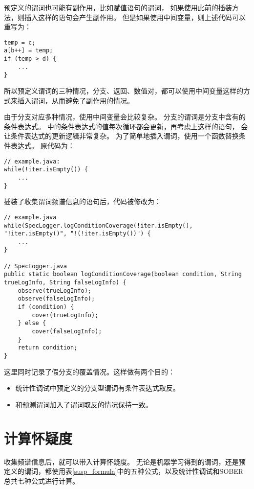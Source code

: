 预定义的谓词也可能有副作用，比如赋值语句的谓词，
如果使用此前的插装方法，则插入这样的语句会产生副作用。
但是如果使用中间变量，则上述代码可以重写为：
\lstset{language=Java}
\begin{lstlisting}
temp = c;
a[b++] = temp;
if (temp > d) {
    ...
}
\end{lstlisting}
所以预定义谓词的三种情况，分支、返回、数值对，都可以使用中间变量这样的方式来插入谓词，从而避免了副作用的情况。

由于分支对应多种情况，使用中间变量会比较复杂。
分支的谓词是分支中含有的条件表达式。
中的条件表达式的值每次循环都会更新，再考虑上这样的语句，
会让条件表达式的更新逻辑非常复杂。
为了简单地插入谓词，使用一个函数替换条件表达式。
原代码为：
\lstset{language=Java}
\begin{lstlisting}
// example.java:
while(!iter.isEmpty()) {
	...
}
\end{lstlisting}
插装了收集谓词频谱信息的语句后，代码被修改为：
\lstset{language=Java}
\begin{lstlisting}
// example.java
while(SpecLogger.logConditionCoverage(!iter.isEmpty(), "!iter.isEmpty()", "!(!iter.isEmpty())") {
	...
}

// SpecLogger.java
public static boolean logConditionCoverage(boolean condition, String trueLogInfo, String falseLogInfo) {
	observe(trueLogInfo);
	observe(falseLogInfo);
	if (condition) {
		cover(trueLogInfo);
	} else {
		cover(falseLogInfo);
	}
	return condition;
}
\end{lstlisting}
这里同时记录了假分支的覆盖情况。这样做有两个目的：
\begin{itemize}
\item 统计性调试中预定义的分支型谓词有条件表达式取反。
\item 和预测谓词加入了谓词取反的情况保持一致。
\end{itemize}

\section{计算怀疑度}

收集频谱信息后，就可以带入计算怀疑度。
无论是机器学习得到的谓词，还是预定义的谓词，都使用表\ref{susp_formula}中的五种公式，以及统计性调试和SOBER总共七种公式进行计算。

